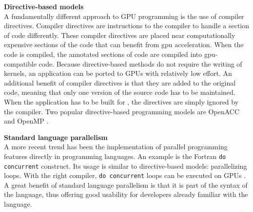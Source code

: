 \textbf{Directive-based models} \\
A fundamentally different approach to GPU programming is the use of compiler directives. Compiler directives are instructions to the compiler to handle a section of code differently. These compiler directives are placed near computationally expensive sections of the code that can benefit from \acrshort{gpu} acceleration. When the code is compiled, the annotated sections of code are compiled into \acrshort{gpu}-compatible code. Because directive-based methods do not require the writing of kernels, an application can be ported to GPUs with relatively low effort. An additional benefit of compiler directives is that they are added to the original code, meaning that only one version of the source code has to be maintained. When the application has to be built for , the directives are simply ignored by the compiler. Two popular directive-based programming models are OpenACC \citep{farberParallelProgrammingOpenACC2017} and OpenMP \citep{antaoOffloadingSupportOpenMP2016}.

\textbf{Standard language parallelism} \\
A more recent trend has been the implementation of parallel programming features directly in programming languages. An example is the Fortran \texttt{do concurrent} construct. Its usage is similar to directive-based models: parallelizing loops. With the right compiler, \texttt{do concurrent} loops can be executed on GPUs \citep{kedwardStateFortran2022}. A great benefit of standard language parallelism is that it is part of the syntax of the language, thus offering good usability for developers already familiar with the language. 

